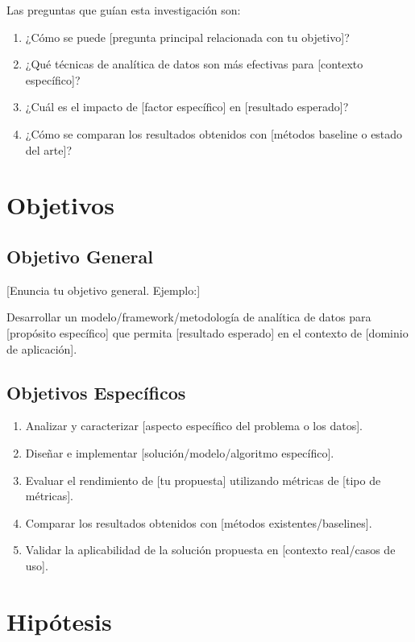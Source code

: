 Las preguntas que guían esta investigación son:

\begin{enumerate}
    \item ¿Cómo se puede [pregunta principal relacionada con tu objetivo]?
    \item ¿Qué técnicas de analítica de datos son más efectivas para [contexto específico]?
    \item ¿Cuál es el impacto de [factor específico] en [resultado esperado]?
    \item ¿Cómo se comparan los resultados obtenidos con [métodos baseline o estado del arte]?
\end{enumerate}

\section{Objetivos}

\subsection{Objetivo General}

[Enuncia tu objetivo general. Ejemplo:]

Desarrollar un modelo/framework/metodología de analítica de datos para [propósito específico] que permita [resultado esperado] en el contexto de [dominio de aplicación].

\subsection{Objetivos Específicos}

\begin{enumerate}
    \item Analizar y caracterizar [aspecto específico del problema o los datos].
    \item Diseñar e implementar [solución/modelo/algoritmo específico].
    \item Evaluar el rendimiento de [tu propuesta] utilizando métricas de [tipo de métricas].
    \item Comparar los resultados obtenidos con [métodos existentes/baselines].
    \item Validar la aplicabilidad de la solución propuesta en [contexto real/casos de uso].
\end{enumerate}

\section{Hipótesis}

